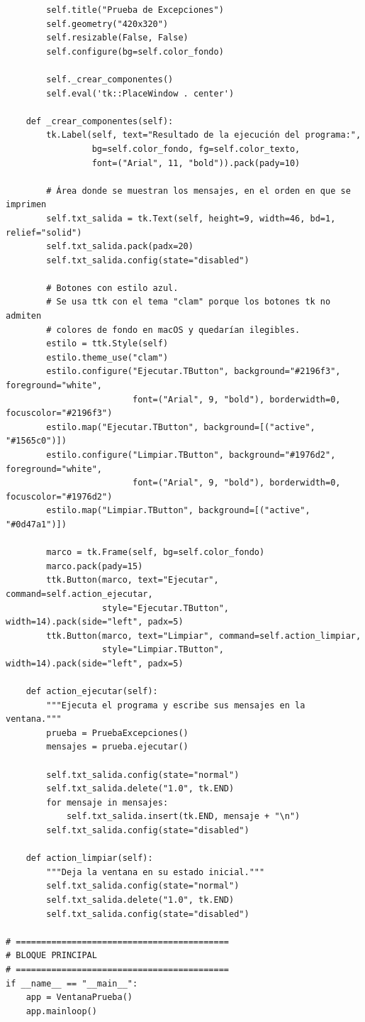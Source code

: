 \documentclass[11pt, a4paper]{article}
\begin{document}
\begin{lstlisting}
        self.title("Prueba de Excepciones")
        self.geometry("420x320")
        self.resizable(False, False)
        self.configure(bg=self.color_fondo)

        self._crear_componentes()
        self.eval('tk::PlaceWindow . center')

    def _crear_componentes(self):
        tk.Label(self, text="Resultado de la ejecución del programa:",
                 bg=self.color_fondo, fg=self.color_texto,
                 font=("Arial", 11, "bold")).pack(pady=10)

        # Área donde se muestran los mensajes, en el orden en que se imprimen
        self.txt_salida = tk.Text(self, height=9, width=46, bd=1, relief="solid")
        self.txt_salida.pack(padx=20)
        self.txt_salida.config(state="disabled")

        # Botones con estilo azul.
        # Se usa ttk con el tema "clam" porque los botones tk no admiten
        # colores de fondo en macOS y quedarían ilegibles.
        estilo = ttk.Style(self)
        estilo.theme_use("clam")
        estilo.configure("Ejecutar.TButton", background="#2196f3", foreground="white",
                         font=("Arial", 9, "bold"), borderwidth=0, focuscolor="#2196f3")
        estilo.map("Ejecutar.TButton", background=[("active", "#1565c0")])
        estilo.configure("Limpiar.TButton", background="#1976d2", foreground="white",
                         font=("Arial", 9, "bold"), borderwidth=0, focuscolor="#1976d2")
        estilo.map("Limpiar.TButton", background=[("active", "#0d47a1")])

        marco = tk.Frame(self, bg=self.color_fondo)
        marco.pack(pady=15)
        ttk.Button(marco, text="Ejecutar", command=self.action_ejecutar,
                   style="Ejecutar.TButton", width=14).pack(side="left", padx=5)
        ttk.Button(marco, text="Limpiar", command=self.action_limpiar,
                   style="Limpiar.TButton", width=14).pack(side="left", padx=5)

    def action_ejecutar(self):
        """Ejecuta el programa y escribe sus mensajes en la ventana."""
        prueba = PruebaExcepciones()
        mensajes = prueba.ejecutar()

        self.txt_salida.config(state="normal")
        self.txt_salida.delete("1.0", tk.END)
        for mensaje in mensajes:
            self.txt_salida.insert(tk.END, mensaje + "\n")
        self.txt_salida.config(state="disabled")

    def action_limpiar(self):
        """Deja la ventana en su estado inicial."""
        self.txt_salida.config(state="normal")
        self.txt_salida.delete("1.0", tk.END)
        self.txt_salida.config(state="disabled")

# ==========================================
# BLOQUE PRINCIPAL
# ==========================================
if __name__ == "__main__":
    app = VentanaPrueba()
    app.mainloop()
\end{lstlisting}
\end{document}
